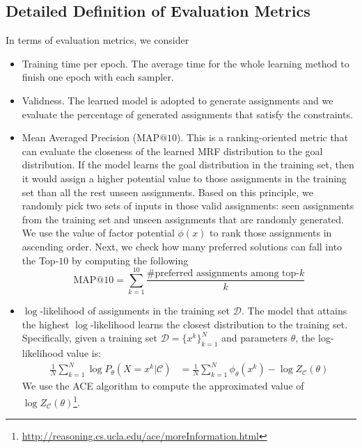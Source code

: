 \subsection{Detailed Definition of Evaluation Metrics}
In terms of evaluation metrics, we consider
\begin{itemize}
    \item Training time per epoch. The average time for the whole learning method  to finish one epoch with each sampler.
    \item Validness. The learned model is adopted to generate assignments and we evaluate the percentage of generated assignments that satisfy the constraints.
    \item  Mean Averaged Precision (MAP$@10$).  This is a ranking-oriented metric that can evaluate the closeness of  the learned MRF  distribution to the  goal distribution. If the model learns the goal distribution in the training set, then it would assign a higher potential value to those assignments in the training set than all the rest unseen assignments. Based on this principle,
    we randomly pick two sets of inputs in those valid assignments: seen assignments from the training set  and unseen  assignments that are randomly generated. We use the value of factor potential $\phi(x)$ to rank those assignments in ascending order.  Next, we check how many preferred solutions can fall into the Top-$10$ by computing the following
\begin{equation*}
\text{MAP}@10=\sum_{k=1}^{10}\frac{\#\text{preferred assignments among top-} k}{k}
\end{equation*}

    \item $\log$-likelihood of assignments in the training set $\mathcal{D}$. The model that attains the highest $\log$-likelihood learns the closest  distribution to the training set.  Specifically, given a training set $\mathcal{D}=\{x^k\}_{k=1}^N$ and parameters $\theta$, the log-likelihood value is:
\begin{equation} 
\begin{aligned}
{\frac{1}{N}\sum_{k=1}^N\log P_{\theta}(X=x^k|\mathcal{C})}&=\frac{1}{N}\sum_{k=1}^N\phi_\theta(x^k)- \log Z_\mathcal{C}(\theta)
\end{aligned}
\end{equation}
We use the ACE algorithm to compute the approximated value of $\log Z_\mathcal{C}(\theta) $\footnote{\url{http://reasoning.cs.ucla.edu/ace/moreInformation.html}}.


\end{itemize}
